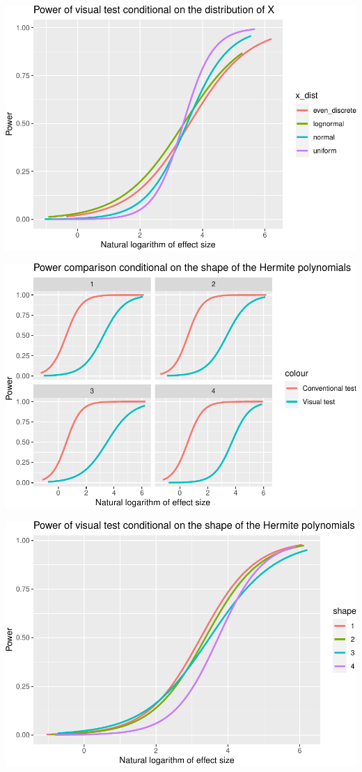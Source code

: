 \documentclass[]{interact}
\theoremstyle{plain}%
\theoremstyle{definition}
\theoremstyle{remark}
\begin{document}
\includegraphics{paper_comparison_files/figure-latex/power-of-visual-test-given-x-dist-1.pdf}

\includegraphics{paper_comparison_files/figure-latex/power-vs-log-effect-size-given-shape-1.pdf}

\includegraphics{paper_comparison_files/figure-latex/power-of-visual-test-given-shape-1.pdf}
\end{document}
